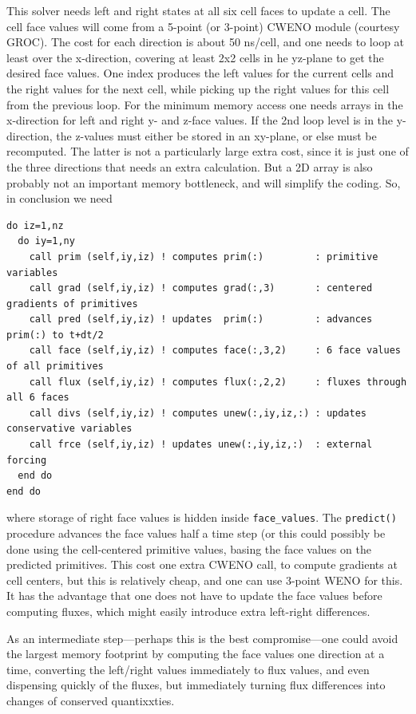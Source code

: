 \documentclass[paper=a4,fontsize=11pt]{scrartcl}
\numberwithin{equation}{section}		%
\numberwithin{figure}{section}			%
\numberwithin{table}{section}				%
\newcommand{\codecolor}{\color{Blue}}
\begin{document}
This solver needs left and right states at all six cell faces to update a cell.  The cell face values will come from a 5-point (or 3-point) CWENO module (courtesy GROC).  The cost for each direction is about 50 ns/cell, and one needs to loop at least over the x-direction, covering at least 2x2 cells in he yz-plane to get the desired face values.   One index produces the left values for the current cells and the right values for the next cell, while picking up the right values for this cell from the previous loop.  For the minimum memory access one needs arrays in the x-direction for left and right y- and z-face values.  If the 2nd loop level is in the y-direction, the z-values must either be stored in an xy-plane, or else must be recomputed.  The latter is not a particularly large extra cost, since it is just one of the three directions that needs an extra calculation.  But a 2D array is also probably not an important memory bottleneck, and will simplify the coding.  So, in conclusion we need
{\small\codecolor\begin{verbatim}
do iz=1,nz
  do iy=1,ny
    call prim (self,iy,iz) ! computes prim(:)         : primitive variables
    call grad (self,iy,iz) ! computes grad(:,3)       : centered gradients of primitives
    call pred (self,iy,iz) ! updates  prim(:)         : advances prim(:) to t+dt/2
    call face (self,iy,iz) ! computes face(:,3,2)     : 6 face values of all primitives
    call flux (self,iy,iz) ! computes flux(:,2,2)     : fluxes through all 6 faces
    call divs (self,iy,iz) ! computes unew(:,iy,iz,:) : updates conservative variables
    call frce (self,iy,iz) ! updates unew(:,iy,iz,:)  : external forcing
  end do
end do
\end{verbatim}}
where storage of right face values is hidden inside \verb|face_values|.  The \verb|predict()| procedure advances the face values half a time step (or this could possibly be done using the cell-centered primitive values, basing the face values on the predicted primitives.  This cost one extra CWENO call, to compute gradients at cell centers, but this is relatively cheap, and one can use 3-point WENO for this.  It has the advantage that one does not have to update the face values before computing fluxes, which might easily introduce extra left-right differences.

As an intermediate step---perhaps this is the best compromise---one could avoid the largest memory footprint by computing the face values one direction at a time, converting the left/right values immediately to flux values, and even dispensing quickly of the fluxes, but immediately turning flux differences into changes of conserved quantixxties.
\end{document}
